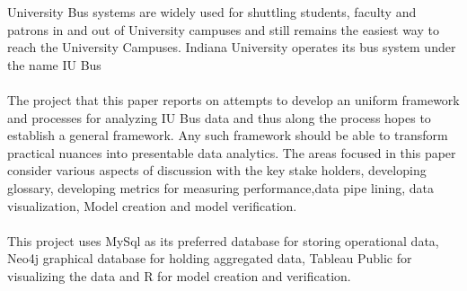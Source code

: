 \documentclass[12pt]{article}\usepackage[]{graphicx}\usepackage[]{color}
\renewenvironment{abstract}
 {\small
  \begin{center}
  \bfseries \abstractname\vspace{-.5em}\vspace{0pt}
  \end{center}
  \list{}{
    \setlength{\leftmargin}{.5cm}%
    \setlength{\rightmargin}{\leftmargin}%
  }%
  \item\relax}
 {\endlist}
\begin{document}
\begin{abstract}
University Bus systems are widely used for shuttling students, faculty and patrons in and out of University campuses and still remains the easiest way to reach the University Campuses. Indiana University operates its bus system under the name IU Bus\cite{1} \\ \\
The project that this paper reports on attempts to develop an uniform framework and processes for analyzing IU Bus data and thus along the process hopes to establish a general framework. Any such framework should be able to transform practical nuances into presentable data analytics. The areas focused in this paper consider various aspects of discussion with the key stake holders, developing glossary, developing metrics for measuring performance,data pipe lining, data visualization, Model creation and model verification.\\ \\
This project uses MySql as its preferred database for storing operational data, Neo4j graphical database for holding aggregated data, Tableau Public for visualizing the data and R for model creation and verification.
\end{abstract}

\clearpage

\tableofcontents
\clearpage
\end{document}
